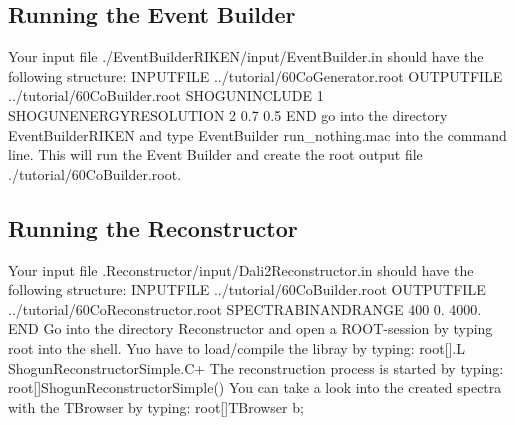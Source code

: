 \documentclass[12pt]{book}
\begin{document}
{\subsection{Running the Event Builder}
Your input file {\ttfamily ./EventBuilderRIKEN/input/EventBuilder.in} should have the following structure:\hfill{}
\linebreak
\linebreak
{\ttfamily %
  INPUTFILE ../tutorial/60CoGenerator.root\linebreak
  OUTPUTFILE ../tutorial/60CoBuilder.root\linebreak
  SHOGUNINCLUDE 1\linebreak
  SHOGUNENERGYRESOLUTION 2 0.7 0.5\linebreak
  END
}
\linebreak
\linebreak
go into the directory {\ttfamily EventBuilderRIKEN} and type\hfill{}
\linebreak
{\ttfamily
  EventBuilder run\_nothing.mac
}
\linebreak
\linebreak
into the command line. 
This will run the Event Builder and create the root output file {\ttfamily ./tutorial/60CoBuilder.root}.

\subsection{Running the Reconstructor}
Your input file {\ttfamily .Reconstructor/input/Dali2Reconstructor.in} should have the following structure:\hfill{}
\linebreak
\linebreak
{\ttfamily %
  INPUTFILE ../tutorial/60CoBuilder.root\linebreak
  OUTPUTFILE ../tutorial/60CoReconstructor.root\linebreak
  SPECTRABINANDRANGE 400 0. 4000.\linebreak
  END
}
\linebreak
\linebreak
Go into the directory {\ttfamily Reconstructor} and open a ROOT-session by typing {\ttfamily root}
into the shell. Yuo have to load/compile the libray by typing:\hfill{}
\linebreak
\linebreak
{\ttfamily
 root[].L ShogunReconstructorSimple.C+\linebreak
}
\linebreak
The reconstruction process is started by typing:\hfill{}
\linebreak
\linebreak
{\ttfamily
root[]ShogunReconstructorSimple()\linebreak
}
\linebreak
You can take a look into the created spectra with the TBrowser by typing:\hfill{}
\linebreak
\linebreak
{\ttfamily
root[]TBrowser b;\linebreak
}
\linebreak


}
\end{document}
